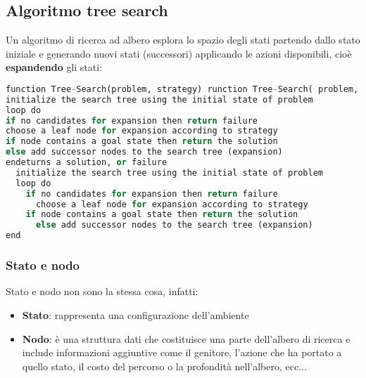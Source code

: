 \documentclass[a4paper]{article}
\begin{document}
\subsection{Algoritmo tree search}
Un algoritmo di ricerca ad albero esplora lo spazio degli stati partendo dallo stato iniziale
e generando nuovi stati (successori) applicando le azioni disponibili, cioè 
\textbf{espandendo} gli stati:
\begin{lstlisting}[language=Python]
function Tree-Search(problem, strategy) runction Tree-Search( problem, strategy) returns a solution, or failure
initialize the search tree using the initial state of problem
loop do
if no candidates for expansion then return failure
choose a leaf node for expansion according to strategy
if node contains a goal state then return the solution
else add successor nodes to the search tree (expansion)
endeturns a solution, or failure
  initialize the search tree using the initial state of problem
  loop do
    if no candidates for expansion then return failure
      choose a leaf node for expansion according to strategy
    if node contains a goal state then return the solution
      else add successor nodes to the search tree (expansion)
end
\end{lstlisting}

\subsubsection{Stato e nodo}
Stato e nodo non sono la stessa cosa, infatti:
\begin{itemize}
  \item \textbf{Stato}: rappresenta una configurazione dell'ambiente
  \item \textbf{Nodo}: è una struttura dati che costituisce una parte dell'albero di ricerca
    e include informazioni aggiuntive come il genitore, l'azione che ha portato a quello stato,
    il costo del percorso o la profondità nell'albero, ecc...
\end{itemize}
\end{document}
